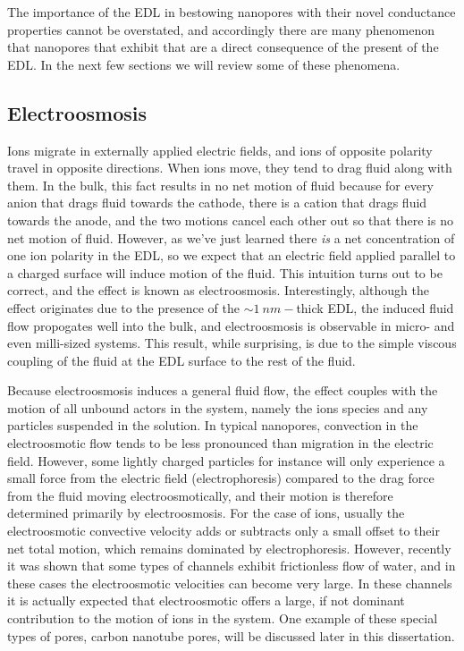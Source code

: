 			The importance of the EDL in bestowing nanopores with their novel conductance properties cannot be overstated, and accordingly there are many phenomenon that nanopores that exhibit that are a direct consequence of the present of the EDL. In the next few sections we will review some of these phenomena.
			
			
		\subsection{Electroosmosis}
			
			Ions migrate in externally applied electric fields, and ions of opposite polarity travel in opposite directions. When ions move, they tend to drag fluid along with them. In the bulk, this fact results in no net motion of fluid because for every anion that drags fluid towards the cathode, there is a cation that drags fluid towards the anode, and the two motions cancel each other out so that there is no net motion of fluid. However, as we've just learned there \textit{is} a net concentration of one ion polarity in the EDL, so we expect that an electric field applied parallel to a charged surface will induce motion of the fluid. This intuition turns out to be correct, and the effect is known as electroosmosis. Interestingly, although the effect originates due to the presence of the $\sim \SI{1}{nm}-$thick EDL, the induced fluid flow propogates well into the bulk, and electroosmosis is observable in micro- and even milli-sized systems. This result, while surprising, is due to the simple viscous coupling of the fluid at the EDL surface to the rest of the fluid.
			
			Because electroosmosis induces a general fluid flow, the effect couples with the motion of all unbound actors in the system, namely the ions species and any particles suspended in the solution. In typical nanopores, convection in the electroosmotic flow tends to be less pronounced than migration in the electric field. However, some lightly charged particles for instance will only experience a small force from the electric field (electrophoresis) compared to the drag force from the fluid moving electroosmotically, and their motion is therefore determined primarily by electroosmosis. For the case of ions, usually the electroosmotic convective velocity adds or subtracts only a small offset to their net total motion, which remains dominated by electrophoresis. However, recently it was shown that some types of channels exhibit frictionless flow of water, and in these cases the electroosmotic velocities can become very large. In these channels it is actually expected that electroosmotic offers a large, if not dominant contribution to the motion of ions in the system. One example of these special types of pores, carbon nanotube pores, will be discussed later in this dissertation.
			
